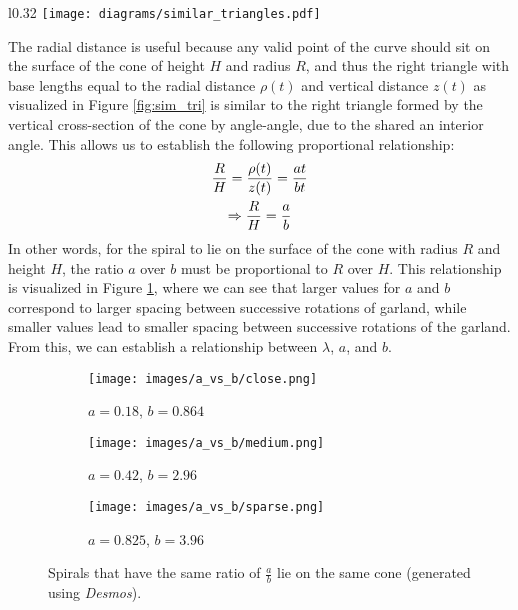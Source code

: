 \clearpage
\begin{wrapfigure}{l}{0.32\textwidth}
    \centering
    \texttt{[image: diagrams/similar\_triangles.pdf]}
    \caption{Similar Triangles.} \label{fig:sim_tri}
\end{wrapfigure}
The radial distance is useful because any valid point of the curve should sit on the surface of the cone of height $H$ and radius $R$, and thus the right triangle with base lengths equal to the radial distance $\rho(t)$ and vertical distance $z(t)$ as visualized in Figure \ref{fig:sim_tri} is similar to the right triangle formed by the vertical cross-section of the cone by angle-angle, due to the shared an interior angle. This allows us to establish the following proportional relationship:
\begin{gather}
    \frac{R}{H} = \frac{\rho(t)}{z(t)} = \frac{at}{bt} \notag \\
    \Rightarrow \frac{R}{H} = \frac{a}{b} \label{eq:proportion}
\end{gather}
In other words, for the spiral to lie on the surface of the cone with radius $R$ and height $H$, the ratio $a$ over $b$ must be proportional to $R$ over $H$. This relationship is visualized in Figure \ref{fig:param_comparison}, where we can see that larger values for $a$ and $b$ correspond to larger spacing between successive rotations of garland, while smaller values lead to smaller spacing between successive rotations of the garland. From this, we can establish a relationship between $\lambda$, $a$, and $b$.

\begin{figure}[H]
    \centering
    \vspace*{5pt}
    \begin{subfigure}[t]{0.32\textwidth}
        \centering
        \texttt{[image: images/a\_vs\_b/close.png]}
        \caption{$a=0.18$, $b=0.864$}
    \end{subfigure}
    \begin{subfigure}[t]{0.32\textwidth}
        \centering
        \texttt{[image: images/a\_vs\_b/medium.png]}
        \caption{$a=0.42$, $b=2.96$}
    \end{subfigure}
    \begin{subfigure}[t]{0.32\textwidth}
        \centering
        \texttt{[image: images/a\_vs\_b/sparse.png]}
        \caption{$a=0.825$, $b=3.96$}
    \end{subfigure}
    \caption{Spirals that have the same ratio of $\frac{a}{b}$ lie on the same cone (generated using \emph{Desmos}).} \label{fig:param_comparison}
\end{figure}

